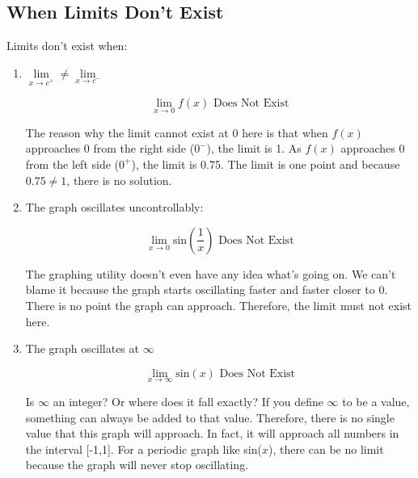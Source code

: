 \documentclass[../revisedMain.tex]{subfiles}
\begin{document}
\subsection{When Limits Don't Exist} Limits don't exist when:
\begin{enumerate}
\item $\lim\limits_{x\to c^+} \neq \lim\limits_{x\to c^-}$
\begin{center}
$$\lim_{x\to 0} f(x) \text{ Does Not Exist}$$
\end{center} 
\par The reason why the limit cannot exist at 0 here is that when $f(x)$ approaches 0 from the right side ($0^-$), the limit is 1. As $f(x)$ approaches 0 from the left side ($0^+$), the limit is 0.75. The limit is one point and because $0.75\neq 1$, there is no solution.
\item The graph oscillates uncontrollably:
\begin{center}
$$\lim_{x\to 0} \text{sin} \left ( \frac{1}{x} \right ) \text{ Does Not Exist}$$
\end{center} \par The graphing utility doesn't even have any idea what's going on. We can't blame it because the graph starts oscillating faster and faster closer to 0. There is no point the graph can approach. Therefore, the limit must not exist here.
\item The graph oscillates at $\infty$
\begin{center}
$$\lim_{x\to\infty} \text{sin}(x) \text{ Does Not Exist}$$
\end{center}
\par Is $\infty$ an integer? Or where does it fall exactly? If you define $\infty$ to be a value, something can always be added to that value. Therefore, there is no single value that this graph will approach. In fact, it will approach all numbers in the interval [-1,1]. For a periodic graph like sin($x$), there can be no limit because the graph will never stop oscillating.
\end{enumerate}
\end{document}
